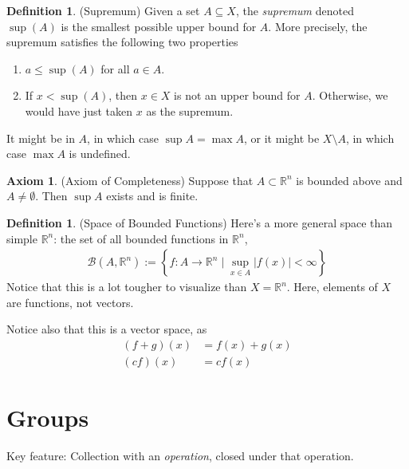 \documentclass[12pt]{book}
\numberwithin{equation}{section} %
\theoremstyle{plain}
\theoremstyle{definition}
\newtheorem{ax}[thm]{Axiom}
\newtheorem{defn}[thm]{Definition}
\theoremstyle{remark}
\newcommand{\R}{\mathbb{R}}
\begin{document}
\begin{defn}{(Supremum)}
\label{defn:supdef1}
Given a set $A\subseteq X$, the \emph{supremum} denoted $\sup(A)$ is the
smallest possible upper bound for $A$.
More precisely, the supremum satisfies the following two properties
\begin{enumerate}
  \item $a\leq \sup(A)$ for all $a\in A$.
  \item If $x<\sup(A)$, then $x\in X$ is not an upper bound for $A$.
    Otherwise, we would have just taken $x$ as the supremum.
\end{enumerate}
It might be in $A$, in which case $\sup A = \max A$, or it might be
$X\setminus A$, in which case $\max A$ is undefined.
\end{defn}

\begin{ax}{(Axiom of Completeness)}
\label{ax:completeness}
Suppose that $A\subset \R^n$ is bounded above and $A\neq
\emptyset$. Then $\sup A$ exists and is finite.
\end{ax}

\begin{defn}{(Space of Bounded Functions)}
Here's a more general space than simple $\R^n$: the set of all
bounded functions in $\R^n$,
\begin{align*}
  \mathscr{B}(A,\R^n)
  :=
  \left\{
    f:A\rightarrow \R^n \; \big| \; \sup_{x\in A} |f(x)|<\infty
  \right\}
\end{align*}
Notice that this is a lot tougher to visualize than $X=\R^n$.
Here, elements of $X$ are functions, not vectors.

Notice also that this is a vector space, as
\begin{align*}
  (f+g)(x) &= f(x) + g(x)\\
  (cf)(x) &= cf(x)
\end{align*}
\end{defn}



\clearpage
\section{Groups}

Key feature:
Collection with an \emph{operation}, closed under that operation.
\end{document}
